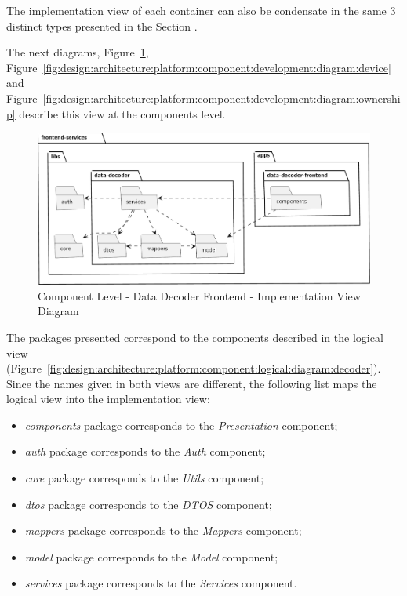 The implementation view of each container can also be condensate in the same 3 distinct types presented in the Section .

The next diagrams, Figure~\ref{fig:design:architecture:platform:component:development:diagram:decoder}, Figure~\ref{fig:design:architecture:platform:component:development:diagram:device} and Figure~\ref{fig:design:architecture:platform:component:development:diagram:ownership} describe this view at the components level.

\begin{figure}[H]
   \centering
   \includegraphics[page=1,width=\columnwidth]{assets/diagrams/design/architectural/level3/development/data-decoder-frontend.pdf}
   \caption[Component Level - Data Decoder Frontend - Implementation View Diagram]{Component Level - Data Decoder Frontend - Implementation View Diagram}
   \label{fig:design:architecture:platform:component:development:diagram:decoder}
\end{figure}

The packages presented correspond to the components described in the logical view (Figure~\ref{fig:design:architecture:platform:component:logical:diagram:decoder}). Since the names given in both views are different, the following list maps the logical view into the implementation view:

\begin{itemize}
   \item \textit{components} package corresponds to the \textit{Presentation} component;
   \item \textit{auth} package corresponds to the \textit{Auth} component;
   \item \textit{core} package corresponds to the \textit{Utils} component;
   \item \textit{dtos} package corresponds to the \textit{DTOS} component;
   \item \textit{mappers} package corresponds to the \textit{Mappers} component;
   \item \textit{model} package corresponds to the \textit{Model} component;
   \item \textit{services} package corresponds to the \textit{Services} component.
\end{itemize}

